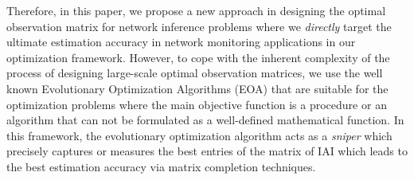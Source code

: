 Therefore, in this paper, we propose a new approach in designing the optimal observation matrix for network inference problems where we \emph{directly} target the ultimate estimation accuracy in network monitoring applications in our optimization framework. However, to cope with the inherent complexity of the process of designing large-scale optimal observation matrices, we use the well known Evolutionary Optimization Algorithms (EOA) that are suitable for the optimization problems where the main objective function is a procedure or an algorithm that can not be formulated as a well-defined mathematical function. In this framework, the evolutionary optimization algorithm acts as a \emph{sniper} which precisely captures or measures the best entries of the matrix of IAI which leads to the best estimation accuracy via matrix completion techniques. 
